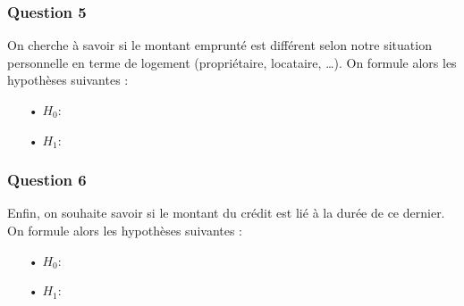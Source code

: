 \documentclass[
]{article}
\begin{document}
\hypertarget{question-5}{%
\subsubsection{Question 5}\label{question-5}}

On cherche à savoir si le montant emprunté est différent selon notre
situation personnelle en terme de logement (propriétaire, locataire,
\ldots). On formule alors les hypothèses suivantes :

\begin{itemize}
\item[•] $H_0 :$ 
\item[•] $H_1 :$ 
\end{itemize}

\hypertarget{question-6}{%
\subsubsection{Question 6}\label{question-6}}

Enfin, on souhaite savoir si le montant du crédit est lié à la durée de
ce dernier. On formule alors les hypothèses suivantes :

\begin{itemize}
\item[•] $H_0 :$ 
\item[•] $H_1 :$ 
\end{itemize}
\end{document}
